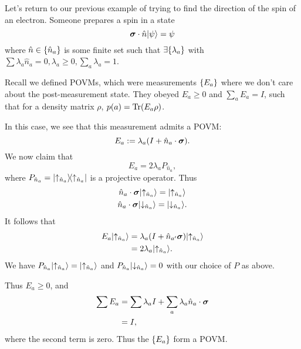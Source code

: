 \begin{exm}
    Let's return to our previous example of trying to find the direction of the spin of an electron. Someone prepares a spin in a state
    \begin{equation}
        \mbox{\boldmath$ \sigma $} \cdot \hat n \lvert\psi\rangle=\psi
    \end{equation}
    where $\hat n\in \{\hat n_a\}$ is some finite set such that $\exists \{\lambda_a\}$ with $\sum \lambda_a \hat n_a =0, \lambda_a \geq 0, \sum_a \lambda_a =1$.
    
    Recall we defined POVMs, which were measurements $\{E_a\}$ where we don't care about the post-measurement state. They obeyed $E_a\geq 0$ and $\sum_a E_a=I$, such that for a density matrix $\rho$, $p(a)=\operatorname{Tr}(E_a \rho)$.
    
    In this case, we see that this measurement admits a POVM:
    \begin{equation}
        E_a := \lambda_a(I+\hat n_a \cdot \mbox{\boldmath$ \sigma $}).
    \end{equation}
    We now claim that 
    \begin{equation}
        E_a=2\lambda_a P_{\hat n_a},
    \end{equation}
    where $P_{\hat n_a}=\left\lvert \uparrow_{\hat n_a} \middle\rangle\!\middle\langle \uparrow_{\hat n_a} \right\rvert$ is a projective operator. Thus
    \begin{gather}
        \hat n_a \cdot \mbox{\boldmath$ \sigma $}\lvert\uparrow_{\hat n_a}\rangle=\lvert\uparrow_{\hat n_a}\rangle\\
        \hat n_a \cdot \mbox{\boldmath$ \sigma $} \lvert\downarrow_{\hat n_a}\rangle=\lvert\downarrow_{\hat n_a}\rangle.
    \end{gather}
    It follows that
    \begin{align*}
        E_a \lvert\uparrow_{\hat n_a}\rangle &=\lambda_a(I+\hat n_{a'} \mbox{\boldmath$ \sigma $})\lvert\uparrow_{\hat n_a}\rangle\\
        &=2\lambda_a \lvert\uparrow_{\hat n_a}\rangle.
    \end{align*}
    We have $P_{\hat n_a}\lvert\uparrow_{\hat n_a}\rangle=\lvert\uparrow_{\hat n_a}\rangle$ and $P_{\hat n_a}\lvert\downarrow_{\hat n_a}\rangle=0$ with our choice of $P$ as above.
    
    Thus $E_a \geq 0$, and
    \begin{align*}
        \sum E_a &= \sum \lambda_a I + \sum_a \lambda_a \hat n_a \cdot \mbox{\boldmath$ \sigma $}\\
        &= I,
    \end{align*}
    where the second term is zero. Thus the $\{E_a\}$ form a POVM.
    

\end{exm}
